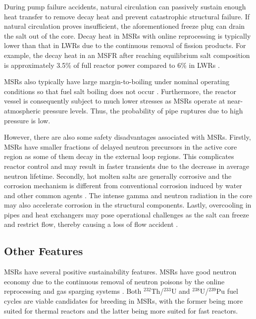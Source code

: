During pump failure accidents, natural circulation can passively sustain
enough heat transfer to remove decay heat and prevent catastrophic structural
failure. If natural circulation proves insufficient, the aforementioned freeze
plug can drain the salt out of the core. Decay heat in \glspl{MSR} with online
reprocessing is typically lower than that in \glspl{LWR} due to the
continuous removal of fission products. For example, the decay heat in an
\gls{MSFR} after reaching equilibrium salt composition is approximately
3.5\% of full reactor power compared to 6\% in \glspl{LWR}
\cite{brovchenko_design-related_2013}.

\glspl{MSR} also typically have large margin-to-boiling under nominal
operating conditions so that fuel salt boiling does not occur
\cite{elsheikh_safety_2013}. Furthermore, the reactor vessel is consequently
subject to much lower stresses as \glspl{MSR} operate at near-atmospheric
pressure levels. Thus, the probability of pipe ruptures due to high pressure
is low.

However, there are also some safety disadvantages associated with \glspl{MSR}.
Firstly, \glspl{MSR} have smaller fractions of delayed neutron precursors in
the active core region as some of them decay in the external loop regions.
This complicates reactor control and may result in faster transients due to
the decrease in average neutron lifetime. Secondly, hot molten salts are
generally corrosive and the corrosion mechanism is different from conventional
corrosion induced by water and other common agents \cite{yoshioka_7_2017}. The
intense gamma and neutron radiation in the core may also accelerate corrosion
in the structural components. Lastly, overcooling in pipes and heat exchangers
may pose operational challenges as the salt can freeze and restrict flow,
thereby causing a loss of flow accident \cite{ho_molten_2013}.

\subsection{Other Features}

\glspl{MSR} have several positive sustainability features.
\glspl{MSR} have good neutron economy due to the continuous removal of
neutron poisons by the online reprocessing and gas sparging systems
\cite{kamei_recent_2012}. Both
$^{232}$Th/$^{233}$U and $^{238}$U/$^{239}$Pu fuel cycles are viable
candidates for breeding in \glspl{MSR}, with the former being more suited for
thermal reactors and the latter being more suited for fast reactors.

